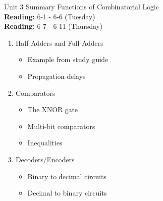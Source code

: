 \documentclass{beamer}
\begin{document}
\begin{frame}{Unit 3 Summary}
\alert{Functions of Combinatorial Logic} \\
\textbf{Reading:} 6-1 - 6-6 (Tuesday) \\
\textbf{Reading:} 6-7 - 6-11 (Thursday)
\begin{enumerate}
\item Half-Adders and Full-Adders
\begin{itemize}
\item Example from study guide
\item Propagation delays
\end{itemize}
\item Comparators
\begin{itemize}
\item The XNOR gate
\item Multi-bit comparators
\item Inequalities
\end{itemize}
\item Decoders/Encoders
\begin{itemize}
\item Binary to decimal circuits
\item Decimal to binary circuits
\end{itemize}
\end{enumerate}
\end{frame}
\end{document}
